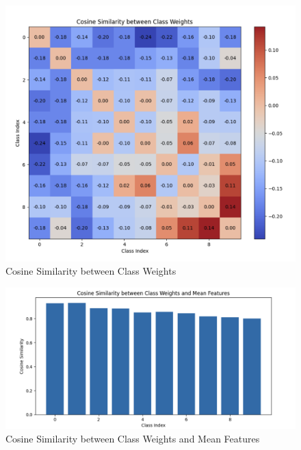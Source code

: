 \documentclass{article}
\begin{document}
\begin{multicols}{2}
\columnbreak
\begin{figure}[H]
\centering
\includegraphics[width=\linewidth]{Plot/CE/cosine_similarity_between_class_weights.png}
\caption{Cosine Similarity between Class Weights}
\end{figure}
\begin{figure}[H]
\centering
\includegraphics[width=\linewidth]{Plot/CE/cosine_similarity_between_class_weights_and_mean_features.png}
\caption{Cosine Similarity between Class Weights and Mean Features}
\end{figure}

\end{multicols} %



\newpage
\end{document}
